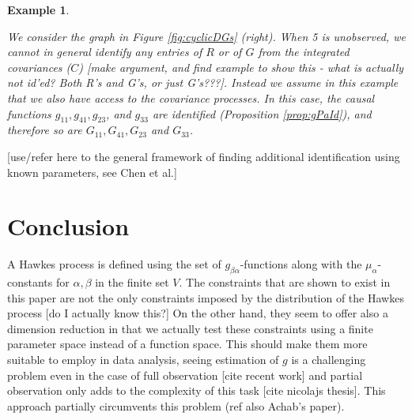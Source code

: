 \documentclass[accepted]{uai2021} %
\newtheorem{exmp}[thm]{Example}
\begin{document}
\begin{exmp}
\begin{figure*}
\begin{subfigure}{0.48\linewidth}
\begin{tikzpicture}[scale=0.7]
			
			\end{tikzpicture}
		\end{subfigure}
		\caption{\label{fig:cyclicDGs} Loops (self-edges) are omitted from this 
		vizualiation. Circles represent observed coordinate processes and 
		squares represent unobserved processes. Left: . Right: }
	\end{figure*}
	
	We consider the graph in Figure \ref{fig:cyclicDGs} (right). When 5 is 
	unobserved, we cannot in general identify any entries of $R$ or of $G$ from 
	the integrated covariances ($C$) [make argument, and find example to show 
	this - what is actually not id'ed? Both R's and G's, or just G's???]. 
	Instead we assume in this example that we also have access to the 
	covariance processes. In this case, the causal functions 
	$g_{11},g_{41},g_{23}$, and $g_{33}$ are identified (Proposition 
	\ref{prop:gPaId}), and therefore so are $G_{11}, G_{41} , G_{23}$ and 
	$G_{33}$.
\end{exmp}

[use/refer here to the general framework of finding additional identification 
using known parameters, see Chen et al.]



\section{Conclusion}

A Hawkes process is defined using the set of $g_{\beta\alpha}$-functions along 
with the $\mu_\alpha$-constants for $\alpha,\beta$ in the finite set $V$. The 
constraints that are shown to exist in this paper are not the only constraints 
imposed by the distribution of the Hawkes process [do I actually know this?] On 
the other hand, they seem to offer also a dimension reduction in that we 
actually test these constraints using a finite parameter space instead of a 
function space. This should make them more suitable to employ in data analysis, 
seeing estimation of $g$ is a challenging problem even in the case of full 
observation [cite recent work] and partial observation only adds to the 
complexity of this task [cite nicolajs thesis]. This approach partially 
circumvents this problem (ref also Achab's paper).




\begin{contributions} %

\end{contributions}
\end{document}
